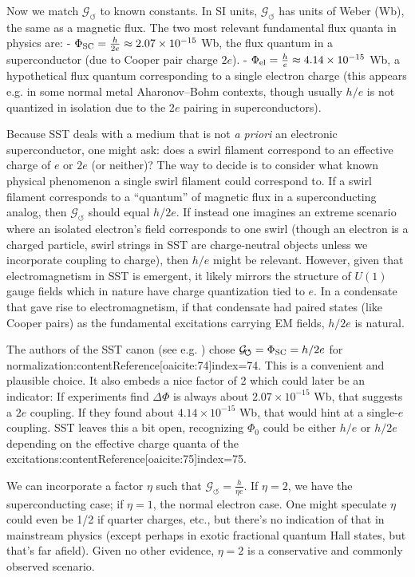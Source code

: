 \documentclass[12pt]{article}
\begin{document}
{Now we match $\mathcal{G}_{\!\boldsymbol{\circlearrowleft}}$ to known constants. In SI units, $\mathcal{G}_{\!\boldsymbol{\circlearrowleft}}$ has units of Weber (Wb), the same as a magnetic flux. The two most relevant fundamental flux quanta in physics are:
- $\Phi_{\rm SC} = \frac{h}{2e} \approx 2.07\times10^{-15}$ Wb, the flux quantum in a superconductor (due to Cooper pair charge $2e$).
- $\Phi_{\rm el} = \frac{h}{e} \approx 4.14\times10^{-15}$ Wb, a hypothetical flux quantum corresponding to a single electron charge (this appears e.g. in some normal metal Aharonov–Bohm contexts, though usually $h/e$ is not quantized in isolation due to the 2$e$ pairing in superconductors).

Because SST deals with a medium that is not \emph{a priori} an electronic superconductor, one might ask: does a swirl filament correspond to an effective charge of $e$ or $2e$ (or neither)? The way to decide is to consider what known physical phenomenon a single swirl filament could correspond to. If a swirl filament corresponds to a “quantum” of magnetic flux in a superconducting analog, then $\mathcal{G}_{\!\boldsymbol{\circlearrowleft}}$ should equal $h/2e$. If instead one imagines an extreme scenario where an isolated electron’s field corresponds to one swirl (though an electron is a charged particle, swirl strings in SST are charge-neutral objects unless we incorporate coupling to charge), then $h/e$ might be relevant. However, given that electromagnetism in SST is emergent, it likely mirrors the structure of $U(1)$ gauge fields which in nature have charge quantization tied to $e$. In a condensate that gave rise to electromagnetism, if that condensate had paired states (like Cooper pairs) as the fundamental excitations carrying EM fields, $h/2e$ is natural.

The authors of the SST canon (see e.g. \cite{Iskandarani2025FluxComp}) chose $\mathcal{G}_{\!\boldsymbol{\circlearrowleft}} = \Phi_{\rm SC} = h/2e$ for normalization:contentReference[oaicite:74]{index=74}. This is a convenient and plausible choice. It also embeds a nice factor of 2 which could later be an indicator: If experiments find $\Delta \Phi$ is always about $2.07\times10^{-15}$ Wb, that suggests a $2e$ coupling. If they found about $4.14\times10^{-15}$ Wb, that would hint at a single-$e$ coupling. SST leaves this a bit open, recognizing $\Phi_{0}$ could be either $h/e$ or $h/2e$ depending on the effective charge quanta of the excitations:contentReference[oaicite:75]{index=75}.

We can incorporate a factor $\eta$ such that $\mathcal{G}_{\!\boldsymbol{\circlearrowleft}} = \frac{h}{\eta e}$. If $\eta=2$, we have the superconducting case; if $\eta=1$, the normal electron case. One might speculate $\eta$ could even be 1/2 if quarter charges, etc., but there's no indication of that in mainstream physics (except perhaps in exotic fractional quantum Hall states, but that’s far afield). Given no other evidence, $\eta=2$ is a conservative and commonly observed scenario.

}
\end{document}
